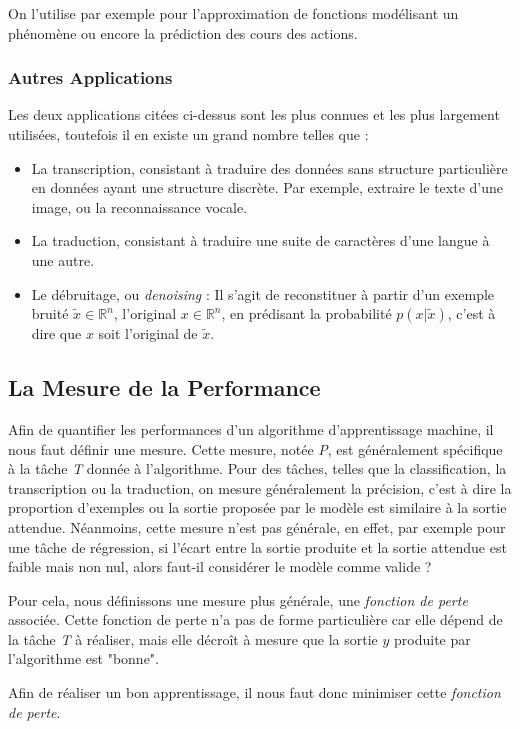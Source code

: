 \documentclass[a4paper, 11pt]{report}
\begin{document}
On l'utilise par exemple pour l'approximation de fonctions modélisant un phénomène ou encore la prédiction des cours des actions.
\subsubsection{Autres Applications}
Les deux applications citées ci-dessus sont les plus connues et les plus largement utilisées, toutefois il en existe un grand nombre telles que :
\begin{itemize}
	\item La transcription, consistant à traduire des données sans structure particulière en données ayant une structure discrète. Par exemple, extraire le texte d'une image, ou la reconnaissance vocale.
	\item La traduction, consistant à traduire une suite de caractères d'une langue à une autre.
	\item Le débruitage, ou \emph{denoising} : Il s'agit de reconstituer à partir d'un exemple bruité $\tilde{x} \in \mathbb{R}^n$, l'original $x \in \mathbb{R}^n$, en prédisant la probabilité $p(x|\tilde{x})$, c'est à dire que $x$ soit l'original de $\tilde{x}$.
\end{itemize}
		
\subsection{La Mesure de la Performance}
Afin de quantifier les performances d'un algorithme d'apprentissage machine, il nous faut définir une mesure. Cette mesure, notée \emph{P}, est généralement spécifique à la tâche \emph{T} donnée à l'algorithme.
Pour des tâches, telles que la classification, la transcription ou la traduction, on mesure généralement la précision, c'est à dire la proportion d'exemples ou la sortie proposée par le modèle est similaire à la sortie attendue.
Néanmoins, cette mesure n'est pas générale, en effet, par exemple pour une tâche de régression, si l'écart entre la sortie produite et la sortie attendue est faible mais non nul, alors faut-il considérer le modèle comme valide ?

Pour cela, nous définissons une mesure plus générale, une \emph{fonction de perte }associée.
Cette fonction de perte n'a pas de forme particulière car elle dépend de la tâche \emph{T} à réaliser, mais elle décroît à mesure que la sortie $y$ produite par l'algorithme est "bonne".

Afin de réaliser un bon apprentissage, il nous faut donc minimiser cette \emph{fonction de perte}.
\end{document}
